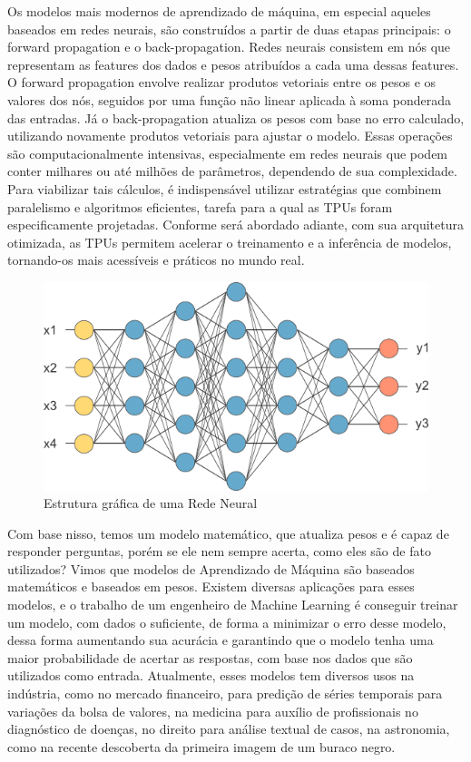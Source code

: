 \documentclass{report}
\begin{document}
Os modelos mais modernos de aprendizado de máquina, em especial aqueles baseados em redes neurais, são construídos a partir de duas etapas principais: o forward propagation e o back-propagation. Redes neurais consistem em nós que representam as features dos dados e pesos atribuídos a cada uma dessas features. O forward propagation envolve realizar produtos vetoriais entre os pesos e os valores dos nós, seguidos por uma função não linear aplicada à soma ponderada das entradas. Já o back-propagation atualiza os pesos com base no erro calculado, utilizando novamente produtos vetoriais para ajustar o modelo.
Essas operações são computacionalmente intensivas, especialmente em redes neurais que podem conter milhares ou até milhões de parâmetros, dependendo de sua complexidade. Para viabilizar tais cálculos, é indispensável utilizar estratégias que combinem paralelismo e algoritmos eficientes, tarefa para a qual as TPUs foram especificamente projetadas. Conforme será abordado adiante, com sua arquitetura otimizada, as TPUs permitem acelerar o treinamento e a inferência de modelos, tornando-os mais acessíveis e práticos no mundo real.

\begin{figure}[h]
	\includegraphics[scale=0.7]{neuralNetwork}
	\centering
	\caption{Estrutura gráfica de uma Rede Neural}
\end{figure}

Com base nisso, temos um modelo matemático, que atualiza pesos e é capaz de responder perguntas, porém se ele nem sempre acerta, como eles são de fato utilizados? Vimos que modelos de Aprendizado de Máquina são baseados matemáticos e baseados em pesos. Existem diversas aplicações para esses modelos, e o trabalho de um engenheiro de Machine Learning é conseguir treinar um modelo, com dados o suficiente, de forma a minimizar o erro desse modelo, dessa forma aumentando sua acurácia e garantindo que o modelo tenha uma maior probabilidade de acertar as respostas, com base nos dados que são utilizados como entrada. Atualmente, esses modelos tem diversos usos na indústria, como no mercado financeiro, para predição de séries temporais para variações da bolsa de valores, na medicina para auxílio de profissionais no diagnóstico de doenças, no direito para análise textual de casos, na astronomia, como na recente descoberta da primeira imagem de um buraco negro. 
\end{document}
